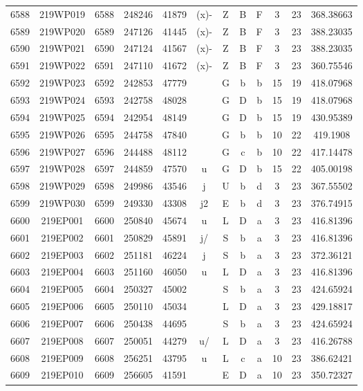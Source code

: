 \begin{tabular}{|*{12}{c|}}
6588 & 219WP019 & 6588 & 248246 & 41879 & (x)- & Z & B & F & 3 & 23 & 368.38663 \\ 
6589 & 219WP020 & 6589 & 247126 & 41445 & (x)- & Z & B & F & 3 & 23 & 388.23035 \\ 
6590 & 219WP021 & 6590 & 247124 & 41567 & (x)- & Z & B & F & 3 & 23 & 388.23035 \\ 
6591 & 219WP022 & 6591 & 247110 & 41672 & (x)- & Z & B & F & 3 & 23 & 360.75546 \\ 
6592 & 219WP023 & 6592 & 242853 & 47779 &  & G & b & b & 15 & 19 & 418.07968 \\ 
6593 & 219WP024 & 6593 & 242758 & 48028 &  & G & D & b & 15 & 19 & 418.07968 \\ 
6594 & 219WP025 & 6594 & 242954 & 48149 &  & G & D & b & 15 & 19 & 430.95389 \\ 
6595 & 219WP026 & 6595 & 244758 & 47840 &  & G & b & b & 10 & 22 & 419.1908 \\ 
6596 & 219WP027 & 6596 & 244488 & 48112 &  & G & c & b & 10 & 22 & 417.14478 \\ 
6597 & 219WP028 & 6597 & 244859 & 47570 & u & G & D & b & 15 & 22 & 405.00198 \\ 
6598 & 219WP029 & 6598 & 249986 & 43546 & j & U & b & d & 3 & 23 & 367.55502 \\ 
6599 & 219WP030 & 6599 & 249330 & 43308 & j2 & E & b & d & 3 & 23 & 376.74915 \\ 
6600 & 219EP001 & 6600 & 250840 & 45674 & u & L & D & a & 3 & 23 & 416.81396 \\ 
6601 & 219EP002 & 6601 & 250829 & 45891 & j/ & S & b & a & 3 & 23 & 416.81396 \\ 
6602 & 219EP003 & 6602 & 251181 & 46224 & j & S & b & a & 3 & 23 & 372.36121 \\ 
6603 & 219EP004 & 6603 & 251160 & 46050 & u & L & D & a & 3 & 23 & 416.81396 \\ 
6604 & 219EP005 & 6604 & 250327 & 45002 &  & S & b & a & 3 & 23 & 424.65924 \\ 
6605 & 219EP006 & 6605 & 250110 & 45034 &  & L & D & a & 3 & 23 & 429.18817 \\ 
6606 & 219EP007 & 6606 & 250438 & 44695 &  & S & b & a & 3 & 23 & 424.65924 \\ 
6607 & 219EP008 & 6607 & 250051 & 44279 & u/ & L & D & a & 3 & 23 & 416.26788 \\ 
6608 & 219EP009 & 6608 & 256251 & 43795 & u & L & c & a & 10 & 23 & 386.62421 \\ 
6609 & 219EP010 & 6609 & 256605 & 41591 &  & E & D & a & 10 & 23 & 350.72327 \\ 

\end{tabular}
